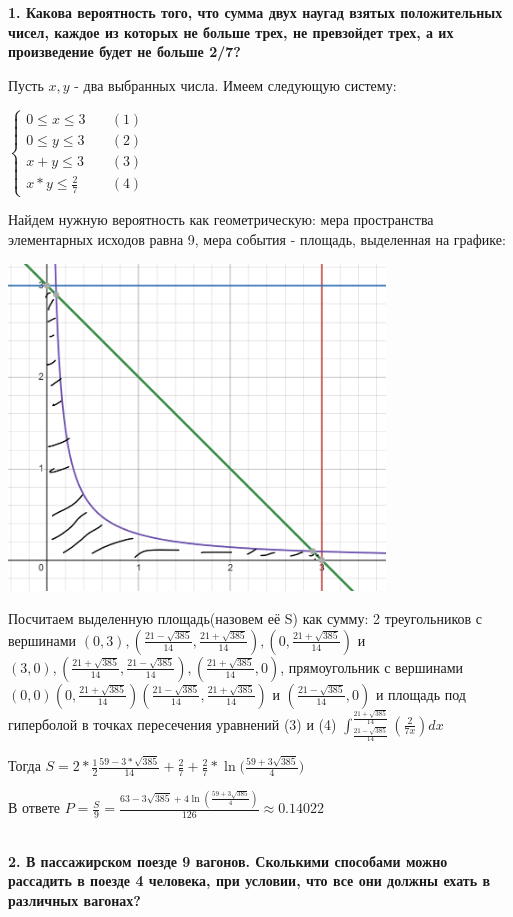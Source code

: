 \documentclass{article}
\newcommand\xp{\frac{21+\sqrt{385}}{14}}
\newcommand\xn{\frac{21-\sqrt{385}}{14}}
\begin{document}
\textbf{1. Какова вероятность того, что сумма двух наугад взятых положительных чисел, каждое из которых не больше трех, не превзойдет трех, а их произведение будет не больше 2/7?}

Пусть $x, y$ - два выбранных числа. Имеем следующую систему:

$\begin{cases}
    0 \leq x \leq 3 & \quad (1) \\
    0 \leq y \leq 3 & \quad(2)\\
    x + y \leq 3 & \quad(3)\\
    x * y \leq \frac{2}{7} & \quad (4)
\end{cases}$

Найдем нужную вероятность как геометрическую: мера пространства элементарных исходов равна 9, мера события - площадь, выделенная на графике:

\includegraphics[width=100mm]{graph}

Посчитаем выделенную площадь(назовем её S) как сумму: 2 треугольников с вершинами $(0,3),(\xn,\xp),(0,\xp)$ и $(3,0),(\xp,\xn),(\xp,0)$, прямоугольник с вершинами $(0,0)(0,\xp)(\xn,\xp) \text{ и }(\xn,0)$ и площадь под гиперболой в точках пересечения уравнений (3) и (4) $\int^{\xp}_{\xn}(\frac{2}{7x})dx$

Тогда $S = 2 * \frac{1}{2} \frac{59-3*\sqrt{385}}{14} + \frac{2}{7} + \frac{2}{7} * \ln({\frac{59+3\sqrt{385}}{4})}$

В ответе $P = \frac{S}{9} = \frac{63 - 3\sqrt{385} + 4\ln({\frac{59 + 3\sqrt{385}}{4}})}{126} \approx 0.14022$


\textbf{\\2. В пассажирском поезде 9 вагонов. Сколькими способами можно рассадить в поезде 4 человека, при условии, что все они должны ехать в различных вагонах?}
\end{document}
